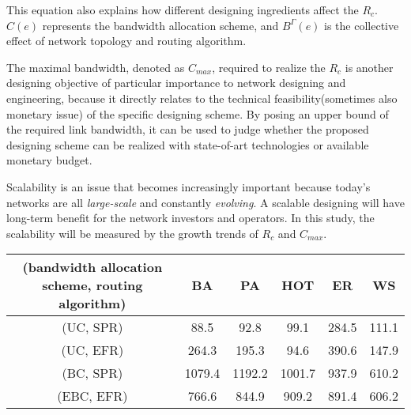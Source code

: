 \documentclass[journal]{IEEEtran}
\begin{document}
{This equation also explains how different designing ingredients
affect the $R_c$. $C(e)$ represents the bandwidth allocation scheme,
and $B^{\Gamma}(e)$ is the collective effect of network topology and
routing algorithm.


 The maximal bandwidth, denoted as $C_{max}$, required to realize the $R_c$ is another
designing objective of particular importance to network designing
and engineering, because it directly relates to the technical
feasibility(sometimes also monetary issue) of the specific designing
scheme. By posing an upper bound of the required link bandwidth, it
can be used to judge whether the proposed designing scheme can be
realized with state-of-art technologies or available monetary
budget.

Scalability is an issue that becomes increasingly important because
today's networks are all \emph{large-scale} and constantly
\emph{evolving}. A scalable designing will have long-term benefit
for the network investors and operators. In this study, the
scalability will be measured by the growth trends of $R_c$ and
$C_{max}$.

\begin{table*}[!t]
\renewcommand{\arraystretch}{1.3}
\centering
 \caption{Theoretical result of the critical
packet-generating rate $R_c$ under different combinations for
networks in Table \ref{basic_info}. The result is obtained from
Equation \ref{fomular}. For each kind of network, we generate 10
instances, and the result is the average of the 10 instances. }
\label{theoretical_result}
\begin{tabular}{c|ccccc}
\hline

(bandwidth allocation scheme, routing algorithm) & BA & PA & HOT &
ER
&WS\\
\hline \hline

(UC, SPR) & 88.5   & 92.8   & 99.1   & 284.5 & 111.1\\
(UC, EFR) & 264.3  & 195.3  & 94.6   & 390.6 & 147.9\\
(BC, SPR) & 1079.4 & 1192.2 & 1001.7 & 937.9 & 610.2\\
(EBC, EFR)& 766.6  & 844.9  & 909.2  & 891.4 & 606.2 \\
 \hline
\end{tabular}
\end{table*}


\begin{table*}[!t]
\renewcommand{\arraystretch}{1.3}
\centering \caption{Simulation result of the critical
packet-generating rate $R_c$ under different combinations for BA,
PA, HOT, ER and WS networks. For each kind of network, 10 instances
are generated and for each instance, we run ten simulations. The
result here is the average over all the simulations. Compared with
Table \ref{simulation_result}, it is shown that the simulation
result is roughly consistent with the theoretical analysis. }
\label{simulation_result}
\begin{tabular}{c|ccccc}
\hline


\end{tabular}
\end{table*}}
\end{document}
